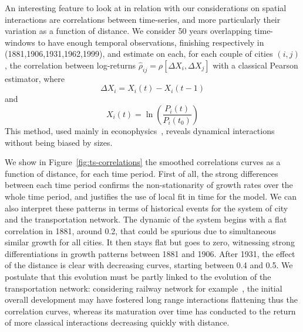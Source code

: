 \documentclass{article}
\begin{document}
An interesting feature to look at in relation with our considerations on spatial interactions are correlations between time-series, and more particularly their variation as a function of distance. We consider 50 years overlapping time-windows to have enough temporal observations, finishing respectively in (1881,1906,1931,1962,1999), and estimate on each, for each couple of cities $(i,j)$, the correlation between log-returns $\hat{\rho}_{ij}=\rho\left[\Delta X_i, \Delta X_j\right]$ with a classical Pearson estimator, where
\[\Delta X_i = X_i(t) - X_i(t-1)\]
and
\[X_i(t) = \ln\left(\frac{P_i(t)}{P_i(t_0)}\right)\]
This method, used mainly in econophysics~\citep{mantegna1999introduction}, reveals dynamical interactions without being biased by sizes.

We show in Figure~\ref{fig:ts-correlations} the smoothed correlations curves as a function of distance, for each time period. First of all, the strong differences between each time period confirms the non-stationarity of growth rates over the whole time period, and justifies the use of local fit in time for the model. We can also interpret these patterns in terms of historical events for the system of city and the transportation network. The dynamic of the system begins with a flat correlation in 1881, around 0.2, that could be spurious due to simultaneous similar growth for all cities. It then stays flat but goes to zero, witnessing strong differentiations in growth patterns between 1881 and 1906. After 1931, the effect of the distance is clear with decreasing curves, starting between 0.4 and 0.5. We postulate that this evolution must be partly linked to the evolution of the transportation network: considering railway network for example~\citep{thevenin2013mapping}, the initial overall development may have fostered long range interactions flattening thus the correlation curves, whereas its maturation over time has conducted to the return of more classical interactions decreasing quickly with distance.
\end{document}
